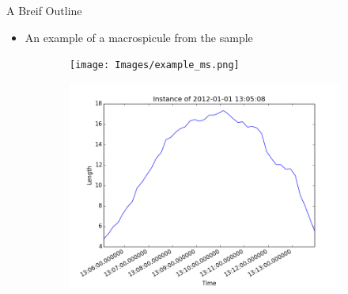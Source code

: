 \documentclass{beamer}
\begin{document}
	\begin{frame}{A Breif Outline}
		\begin{itemize}
			\item An example of a macrospicule from the sample
		\end{itemize}
	\begin{figure}
		\begin{center}
			\begin{subfigure}[b]{0.3\textwidth}
				\begin{center}
					\texttt{[image: Images/example\_ms.png]}
				\end{center}
			\end{subfigure}
			\begin{subfigure}[b]{0.495\textwidth}			
				\begin{center}
					\includegraphics[width=\textwidth]{Figs/example_evo.png}
				\end{center}
			\end{subfigure}			
		\end{center}
	\end{figure}
	\end{frame}
\end{document}
